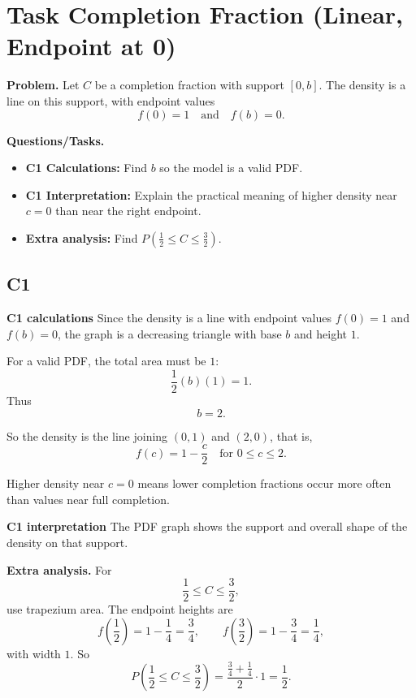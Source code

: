 	\section{Task Completion Fraction (Linear, Endpoint at 0)}
	
	\textbf{Problem.}
	Let $C$ be a completion fraction with support $[0,b]$. The density is a line on this support, with endpoint values
	\[
	f(0)=1
	\quad\text{and}\quad
	f(b)=0.
	\]
	
	\textbf{Questions/Tasks.}
	\begin{itemize}
		\item \textbf{C1 Calculations:} Find $b$ so the model is a valid PDF.
		\item \textbf{C1 Interpretation:} Explain the practical meaning of higher density near $c=0$ than near the right endpoint.
		\item \textbf{Extra analysis:} Find $P\!\left(\frac{1}{2}\le C\le \frac{3}{2}\right)$.
	\end{itemize}
	
	\subsection*{C1}
	
	\textbf{C1 calculations}
	Since the density is a line with endpoint values $f(0)=1$ and $f(b)=0$, the graph is a decreasing triangle with base $b$ and height $1$.
	
	For a valid PDF, the total area must be $1$:
	\[
	\frac12(b)(1)=1.
	\]
	Thus
	\[
	b=2.
	\]
	
	So the density is the line joining $(0,1)$ and $(2,0)$, that is,
	\[
	f(c)=1-\frac{c}{2}\quad\text{for }0\le c\le 2.
	\]
	
	Higher density near $c=0$ means lower completion fractions occur more often than values near full completion.
	
	\textbf{C1 interpretation}
	The PDF graph shows the support and overall shape of the density on that support.
	
	\textbf{Extra analysis.}
	For
	\[
	\frac12\le C\le\frac32,
	\]
	use trapezium area. The endpoint heights are
	\[
	f\!\left(\frac12\right)=1-\frac14=\frac34,
	\qquad
	f\!\left(\frac32\right)=1-\frac34=\frac14,
	\]
	with width $1$. So
	\[
	P\!\left(\frac12\le C\le\frac32\right)
	=
	\frac{\frac34+\frac14}{2}\cdot1
	=
	\frac12.
	\]

